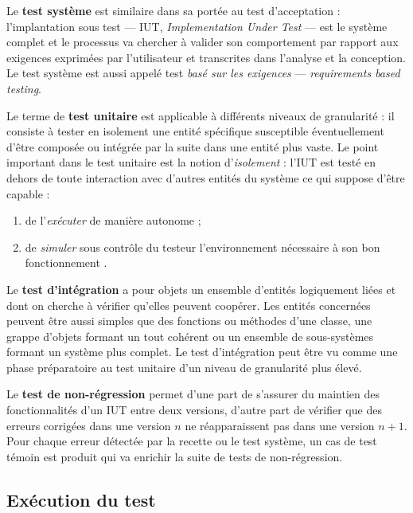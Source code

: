 Le \textbf{test syst\`eme} est similaire dans sa port\'ee au test
d'acceptation : l'implantation sous test ---  \textsf{IUT}, \emph{Implementation
  Under Test} --- est le syst\`eme complet et le processus va
chercher \`a valider son comportement par rapport aux exigences
exprim\'ees par l'utilisateur et transcrites dans l'analyse et la
conception. Le test syst\`eme est aussi
appel\'e test \emph{bas\'e sur les exigences} --- \emph{requirements
  based testing}. 

Le terme de \textbf{test unitaire} est applicable \`a diff\'erents
niveaux de granularit\'e : il consiste \`a tester en isolement une
entit\'e sp\'ecifique susceptible \'eventuellement d'\^etre
compos\'ee ou int\'egr\'ee par la suite dans une entit\'e plus
vaste. Le point important dans le test unitaire est la notion
d'\emph{isolement} : l'\textsf{IUT} est test\'e en dehors de toute interaction
avec d'autres entit\'es du syst\`eme  ce qui suppose
d'\^etre capable : 
\begin{enumerate}
  \item de l'\emph{ex\'ecuter} de mani\`ere autonome ;
  \item de \emph{simuler} sous
    contr\^ole du testeur l'environnement n\'ecessaire \`a son bon fonctionnement .
\end{enumerate}

Le \textbf{test d'int\'egration} a pour
objets un ensemble d'entit\'es logiquement li\'ees et dont on
cherche \`a v\'erifier qu'elles peuvent coop\'erer. Les entit\'es concern\'ees peuvent \^etre aussi simples que
des fonctions ou m\'ethodes  d'une classe, une grappe
d'objets formant un tout coh\'erent ou un ensemble de
sous-syst\`emes formant un syst\`eme plus complet. Le test
d'int\'egration peut \^etre vu comme une phase pr\'eparatoire
au test unitaire d'un niveau de granularit\'e plus \'elev\'e.

Le \textbf{test de non-r\'egression} permet d'une part de s'assurer du maintien
des fonctionnalit\'es d'un IUT entre deux versions, d'autre part de
v\'erifier que des erreurs corrig\'ees dans une version $n$ ne
r\'eapparaissent pas dans une version $n+1$. Pour chaque erreur
d\'etect\'ee par la recette ou le test syst\`eme, un cas de test
t\'emoin est produit qui va enrichir la suite de tests de
non-r\'egression.

\subsection{Ex\'ecution du test}

